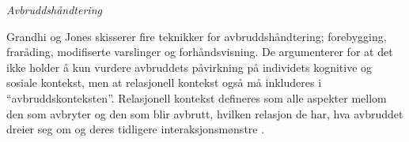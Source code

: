 \noindent
\emph{Avbruddshåndtering}

\noindent
Grandhi og Jones skisserer fire teknikker for avbruddshåndtering; forebygging, fraråding, modifiserte varslinger og forhåndsvisning. De argumenterer for at det ikke holder å kun vurdere avbruddets påvirkning på individets kognitive og sosiale kontekst, men at relasjonell kontekst også må inkluderes i “avbruddskonteksten”. Relasjonell kontekst defineres som alle aspekter mellom den som avbryter og den som blir avbrutt, hvilken relasjon de har, hva avbruddet dreier seg om og deres tidligere interaksjonsmønstre \cite{Grandhi10}.
